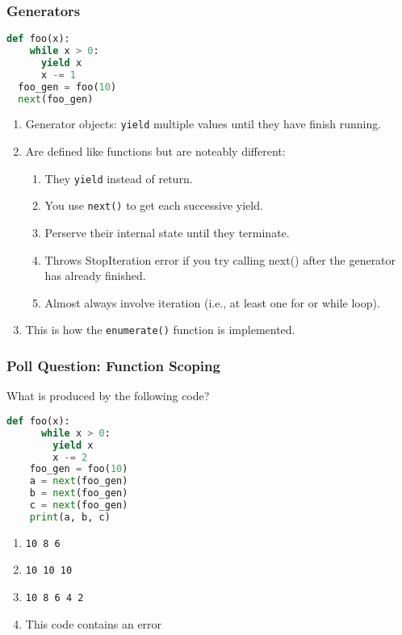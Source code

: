 \documentclass{beamer}
\begin{document}
%
%
\begin{frame}[fragile]
  \frametitle{Generators}
  \begin{lstlisting}[language=Python, autogobble]
  def foo(x):
    while x > 0:
      yield x
      x -= 1
  foo_gen = foo(10)
  next(foo_gen)
  \end{lstlisting}
  \vfill
  \begin{enumerate}[A]
    \item Generator objects: \lstinline|yield| multiple values until they have finish running.
    \item Are defined like functions but are noteably different:
      \begin{enumerate}
        \item They \lstinline|yield| instead of return.
        \item You use \lstinline|next()| to get each successive yield.
        \item Perserve their internal state until they terminate.
        \item Throws StopIteration error if you try calling next() after the generator has already finished.
        \item Almost always involve iteration (i.e., at least one for or while loop).
      \end{enumerate}
    \item This is how the \lstinline|enumerate()| function is implemented.
  \end{enumerate}
\end{frame}



%
%
\begin{frame}[fragile]
  \frametitle{Poll Question: Function Scoping}
  \begin{minipage}{0.69\textwidth}
    What is produced by the following code?
    \begin{lstlisting}[language=Python, autogobble]
    def foo(x):
      while x > 0:
        yield x
        x -= 2
    foo_gen = foo(10)
    a = next(foo_gen)
    b = next(foo_gen)
    c = next(foo_gen)
    print(a, b, c)
    \end{lstlisting}
  \end{minipage}
  \hfill
  \begin{minipage}{0.29\textwidth}
    \begin{enumerate}[A]
      \item \lstinline|10 8 6|
      \item \lstinline|10 10 10|
      \item \lstinline|10 8 6 4 2|
      \item This code contains an error
    \end{enumerate}
  \end{minipage}
\end{frame}
\end{document}
